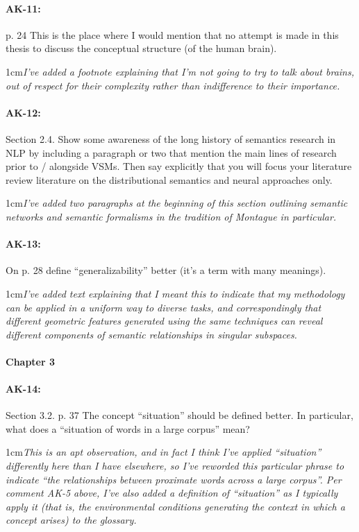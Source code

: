 \documentclass[11pt,a4paper]{article}
\newcommand{\res}[1]{\vspace{0.25cm} \begin{adjustwidth}{1cm}{}\emph{#1}\end{adjustwidth}}
\begin{document}
\paragraph{AK-11:} p. 24 This is the place where I would mention that no attempt is made in this thesis to discuss the conceptual structure (of the human brain).

\res{I've added a footnote explaining that I'm not going to try to talk about brains, out of respect for their complexity rather than indifference to their importance.}

\paragraph{AK-12:} Section 2.4. Show some awareness of the long history of semantics research in NLP by including a paragraph or two that mention the main lines of research prior to / alongside VSMs. Then say explicitly that you will focus your literature review literature on the distributional semantics and neural approaches only.

\res{I've added two paragraphs at the beginning of this section outlining semantic networks and semantic formalisms in the tradition of Montague in particular.}

\paragraph{AK-13:} On p. 28 define “generalizability” better (it’s a term with many meanings).

\res{I've added text explaining that I meant this to indicate that my methodology can be applied in a uniform way to diverse tasks, and correspondingly that different geometric features generated using the same techniques can reveal different components of semantic relationships in singular subspaces.}

\paragraph{Chapter 3}

\paragraph{AK-14:} Section 3.2. p. 37 The concept “situation” should be defined better. In particular, what does a “situation of words in a large corpus” mean?

\res{This is an apt observation, and in fact I think I've applied ``situation'' differently here than I have elsewhere, so I've reworded this particular phrase to indicate ``the relationships between proximate words across a large corpus''.  Per comment AK-5 above, I've also added a definition of ``situation'' as I typically apply it (that is, the environmental conditions generating the context in which a concept arises) to the glossary.}
\end{document}
